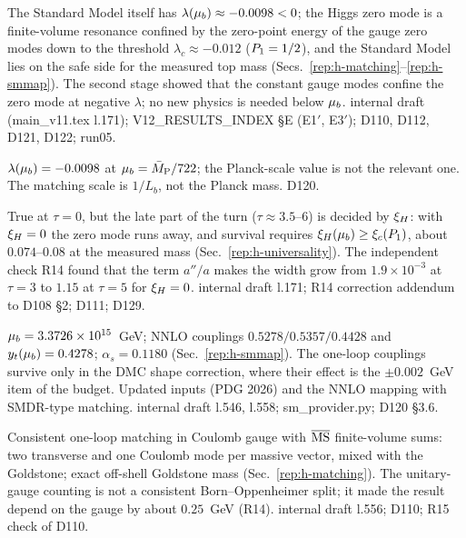 \begin{description}
{The Standard Model itself has $\lambda(\mu_b)\approx-0.0098<0$; the Higgs zero mode is a finite-volume resonance confined by the zero-point energy of the gauge zero modes down to the threshold $\lambda_c\approx-0.012$ ($P_1=1/2$), and the Standard Model lies on the safe side for the measured top mass (Secs.~\ref{rep:h-matching}--\ref{rep:h-smmap}).}
{The second stage showed that the constant gauge modes confine the zero mode at negative $\lambda$; no new physics is needed below $\mu_b$.}
{internal draft (main\_v11.tex l.171); V12\_RESULTS\_INDEX \S E (E1$'$, E3$'$); D110, D112, D121, D122; run05.}

{$\lambda(\mu_b)=-0.0098$ at $\mu_b=\bar M_{\mathrm{P}}/722$; the Planck-scale value is not the relevant one.}
{The matching scale is $1/L_b$, not the Planck mass.}
{D120.}

{True at $\tau=0$, but the late part of the turn ($\tau\approx3.5$--$6$) is decided by $\xi_H$: with $\xi_H=0$ the zero mode runs away, and survival requires $\xi_H(\mu_b)\ge\xi_c(P_1)$, about $0.074$--$0.08$ at the measured mass (Sec.~\ref{rep:h-universality}).}
{The independent check R14 found that the term $a''/a$ makes the width grow from $1.9\times10^{-3}$ at $\tau=3$ to $1.15$ at $\tau=5$ for $\xi_H=0$.}
{internal draft l.171; R14 correction addendum to D108 \S2; D111; D129.}

{$\mu_b=3.3726\times10^{15}$~GeV; NNLO couplings $0.5278/\allowbreak 0.5357/\allowbreak 0.4428$ and $y_t(\mu_b)=0.4278$; $\alpha_s=0.1180$ (Sec.~\ref{rep:h-smmap}). The one-loop couplings survive only in the DMC shape correction, where their effect is the $\pm0.002$~GeV item of the budget.}
{Updated inputs (PDG 2026) and the NNLO mapping with SMDR-type matching.}
{internal draft l.546, l.558; sm\_provider.py; D120 \S3.6.}

{Consistent one-loop matching in Coulomb gauge with $\overline{\mathrm{MS}}$ finite-volume sums: two transverse and one Coulomb mode per massive vector, mixed with the Goldstone; exact off-shell Goldstone mass (Sec.~\ref{rep:h-matching}).}
{The unitary-gauge counting is not a consistent Born--Oppenheimer split; it made the result depend on the gauge by about $0.25$~GeV (R14).}
{internal draft l.556; D110; R15 check of D110.}


\end{description}
